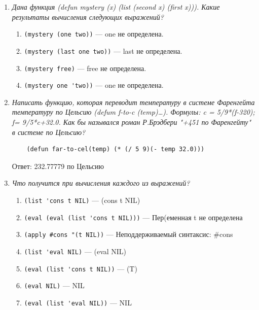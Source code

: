 \begin{enumerate}[wide=0pt]
\begin{enumerate}[label=\arabic*)]
	
\end{enumerate}

\item \textit{Дана функция (defun mystery (x) (list (second x) (first x))).
Какие результаты вычисления следующих выражений? }


\begin{enumerate}[label=\arabic*)]
	\item \lstinline {(mystery (one two))} --- one не определена.
	\item \lstinline {(mystery (last one two))} --- last не определена.
	\item \lstinline {(mystery free)} --- free не определена.
	\item \lstinline {(mystery one 'two))} --- one не определена.

	
\end{enumerate}

\item \textit{Написать функцию, которая переводит температуру в системе Фаренгейта
температуру по Цельсию (defum f-to-c (temp)…).
Формулы: 	c = 5/9*(f-320); 	f= 9/5*c+32.0. 
Как бы назывался роман Р.Брэдбери "+451 по Фаренгейту" в системе по Цельсию?}

\begin{lstlisting}
	(defun far-to-cel(temp) (* (/ 5 9)(- temp 32.0)))
\end{lstlisting}

Ответ: 232.77779 по Цельсию

\item \textit{Что получится при вычисления каждого из выражений?}


\begin{enumerate}[label=\arabic*)]
	\item \lstinline {(list 'cons t NIL)} --- (cons t NIL)
	\item \lstinline {(eval (eval (list 'cons t NIL)))} --- Пер(еменная t не определена
	\item \lstinline {(apply #cons "(t NIL))} --- Неподдерживаемый синтаксис: \#cons
	\item \lstinline {(list 'eval NIL)} --- (eval NIL)
	\item \lstinline {(eval (list 'cons t NIL))} --- (T)
	\item \lstinline {(eval NIL)} --- NIL
	\item \lstinline {(eval (list 'eval NIL))} --- NIL

	
\end{enumerate}

\end{enumerate}